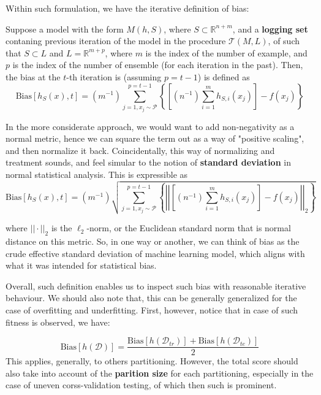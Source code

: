 Within such formulation, we have the iterative definition of bias: 

\begin{definition}
  Suppose a model with the form $M(h,S)$, where $S\subset \mathbb{R}^{n+m}$, and a \textbf{logging set} contaning previous iteration of the model in the procedure $\mathcal{T}(M,L)$, of such that $S\subset L$ and $L = \mathbb{R}^{m + p}$, where $m$ is the index of the number of example, and $p$ is the index of the number of ensemble (for each iteration in the past). Then, the bias at the $t$-th iteration is (assuming $p=t-1$) is defined as
  \begin{equation}
    \mathrm{Bias}[h_S(x), t] = (m^{-1})\sum_{j =1, x_j \sim \mathcal{P}}^{p=t-1} \left\{ \left[(n^{-1}) \sum_{i=1}^{m} h_{S, i}(x_{j})\right] - f(x_{j})\right\}
  \end{equation} 
\end{definition}

In the more considerate approach, we would want to add non-negativity as a normal metric, hence we can square the term out as a way of "positive scaling", and then normalize it back. Coincidentally, this way of normalizing and treatment sounds, and feel simular to the notion of \textbf{standard deviation} in normal statistical analysis. This is expressible as 
\begin{equation}
  \mathrm{Bias}[h_S(x), t] = (m^{-1})\sqrt{\sum_{j =1, x_j \sim \mathcal{P}}^{p=t-1} \left\{ \left\lvert \left\lvert \left[(n^{-1}) \sum_{i=1}^{m} h_{S, i}(x_{j})\right] - f(x_{j}) \right\rvert\right\rvert_{2}\right\}}
\end{equation}

where $||\cdot ||_2$ is the $\ell_{2}$-norm, or the Euclidean standard norm that is normal distance on this metric. So, in one way or another, we can think of bias as the crude effective standard deviation of machine learning model, which aligns with what it was intended for statistical bias.

Overall, such definition enables us to inspect such bias with reasonable iterative behaviour. We should also note that, this can be generally generalized for the case of overfitting and underfitting. First, however, notice that in case of such fitness is observed, we have: 

\begin{equation}
  \mathrm{Bias}[h(\mathcal{D})] =  \frac{\mathrm{Bias}[h(\mathcal{D}_{tr})] + \mathrm{Bias}[h(\mathcal{D}_{te})] }{2}
\end{equation}
This applies, generally, to others partitioning. However, the total score should also take into account of the \textbf{parition size} for each partitioning, especially in the case of uneven corss-validation testing, of which then such is prominent. 

